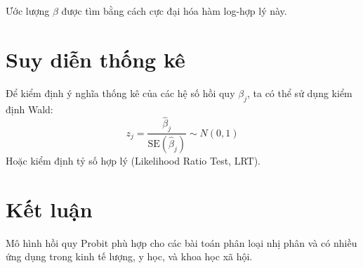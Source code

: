 Ước lượng $\beta$ được tìm bằng cách cực đại hóa hàm log-hợp lý này.

\section{Suy diễn thống kê}
Để kiểm định ý nghĩa thống kê của các hệ số hồi quy $\beta_j$, ta có thể sử dụng kiểm định Wald:
\begin{equation}
    z_j = \frac{\hat{\beta}_j}{\text{SE}(\hat{\beta}_j)} \sim N(0,1)
\end{equation}
Hoặc kiểm định tỷ số hợp lý (Likelihood Ratio Test, LRT).

\section{Kết luận}
Mô hình hồi quy Probit phù hợp cho các bài toán phân loại nhị phân và có nhiều ứng dụng trong kinh tế lượng, y học, và khoa học xã hội.